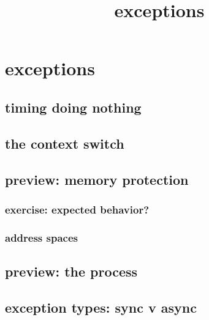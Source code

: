 \graphicspath{{./figures/}}
\title{exceptions}
\date{}

\begin{frame}
    \titlepage
\end{frame}



\section{exceptions}

\subsection{timing doing nothing}




\subsection{the context switch}


\subsection{preview: memory protection}
\subsubsection{exercise: expected behavior?}


\subsubsection{address spaces}



\subsection{preview: the process}


\subsection{exception types: sync v async}
%

